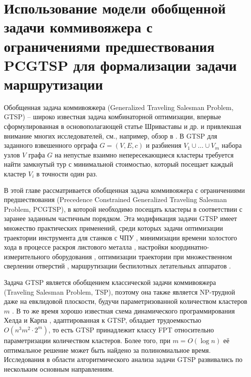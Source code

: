 
\section{%
Использование модели обобщенной задачи коммивояжера
с ограничениями предшествования
PCGTSP
для формализации задачи маршрутизации
}
\label{sec:pcgtsp.intro}

Обобщенная задача коммивояжера
(Generalized Traveling Salesman Problem, GTSP)
-- широко известная задача комбинаторной оптимизации,
впервые сформулированная в основополагающей статье Шриваставы и др.
\cite{SKGS1969}
и привлекшая внимание многих исследователей,
см., например, обзор в
\cite{GutinPunnen2007}.
В GTSP для заданного взвешенного орграфа
$ G = (V, E, c) $
и разбиения
$ V_1 \cup \ldots \cup V_m $
набора узлов $V$ графа $G$ на непустые взаимно непересекающиеся кластеры
требуется найти замкнутый тур с минимальной стоимостью,
который посещает каждый кластер
$V_i$
в точности один раз.

В этой главе рассматривается
обобщенная задача коммивояжера с ограничениями предшествования
(Precedence Constrained Generalized Traveling Salesman Problem, PCGTSP),
в которой необходимо посещать кластеры
в соответствии с заранее заданным частичным порядком.
Эта модификация задачи GTSP имеет множество практических применений, среди которых задачи
оптимизации траектории инструмента для станков с ЧПУ  \cite{CASTELINO2003173},
минимизации времени холостого хода в процессе раскроя листового металла \cite{bi:RoMa,Makarovskikh20181171},
настройки координатно-измерительного оборудования \cite{SALMAN2016138},
оптимизации траектории при множественном сверлении отверстий \cite{DEWIL2019},
маршрутизации беспилотных летательных аппаратов
\cite{bi:XIV}.

Задача GTSP является обобщением классической задачи коммивояжера
(Traveling Salesman Problem, TSP),
поэтому она также является NP-трудной
даже на евклидовой плоскости,
будучи параметризованной количеством кластеров
$m$
\cite{Papa77}.
В то же время хорошо известная схема динамического программирования Хелда и Карпа
\cite{HeldKarp1962},
адаптированная к GTSP,
обладает трудоемкостью
$ O (n ^ 3m ^ 2 \cdot 2 ^ m) $,
то есть
GTSP принадлежит классу FPT
относительно параметризации количеством кластеров.
Более того, при
$ m = O (\log n) $
её оптимальное решение может быть найдено за полиномиальное время.
Исследования в области алгоритмического анализа задачи GTSP
развивались по нескольким основным направлениям.

